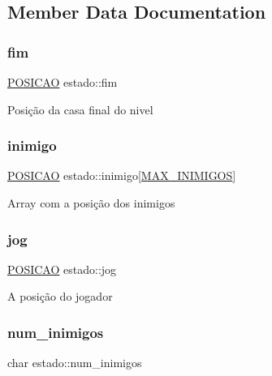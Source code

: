 \subsection{Member Data Documentation}
\mbox{\label{structestado_aee4059f33bcc5157fef35c73197be4ac}} 
\subsubsection{\texorpdfstring{fim}{fim}}
{\footnotesize\ttfamily \hyperlink{estado_8h_a55b3f4b56938eeb8fa5e8f9c07baf1b0}{P\+O\+S\+I\+C\+AO} estado\+::fim}

Posição da casa final do nivel \mbox{\label{structestado_a8f7d47deb337ae082beab6a574ace9e3}} 
\subsubsection{\texorpdfstring{inimigo}{inimigo}}
{\footnotesize\ttfamily \hyperlink{estado_8h_a55b3f4b56938eeb8fa5e8f9c07baf1b0}{P\+O\+S\+I\+C\+AO} estado\+::inimigo\mbox{[}\hyperlink{estado_8h_aa97e6cbfdd94711688f1176cb8dd916a}{M\+A\+X\+\_\+\+I\+N\+I\+M\+I\+G\+OS}\mbox{]}}

Array com a posição dos inimigos \mbox{\label{structestado_abf55d0d40aafdd6829efbc8265b4f724}} 
\subsubsection{\texorpdfstring{jog}{jog}}
{\footnotesize\ttfamily \hyperlink{estado_8h_a55b3f4b56938eeb8fa5e8f9c07baf1b0}{P\+O\+S\+I\+C\+AO} estado\+::jog}

A posição do jogador \mbox{\label{structestado_a6fbc4a80c4f371036f264ecfe27e5f9e}} 
\subsubsection{\texorpdfstring{num\+\_\+inimigos}{num\_inimigos}}
{\footnotesize\ttfamily char estado\+::num\+\_\+inimigos}

